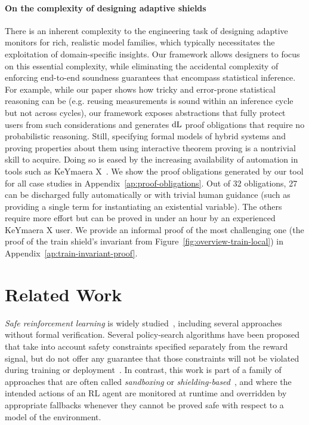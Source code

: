 \documentclass[acmsmall,screen,nonacm]{acmart}
\begin{document}
\paragraph{On the complexity of designing adaptive shields} There is an inherent complexity to the engineering task of designing adaptive monitors for rich, realistic model families, which typically necessitates the exploitation of domain-specific insights. Our framework allows designers to focus on this essential complexity, while eliminating the accidental complexity of enforcing end-to-end soundness guarantees that encompass statistical inference. For example, while our paper shows how tricky and error-prone statistical reasoning can be (e.g. reusing measurements is sound within an inference cycle but not across cycles), our framework exposes abstractions that fully protect users from such considerations and generates $\mathop{}\!\mathrm{d} \text{L}$ proof obligations that require no probabilistic reasoning.
Still, specifying formal models of hybrid systems and proving properties about them using interactive theorem proving is a nontrivial skill to acquire. Doing so is eased by the increasing availability of automation in tools such as KeYmaera X~\cite{DBLP:conf/cade/FultonMQVP15,DBLP:journals/fmsd/SogokonMTCP22}. We show the proof obligations generated by our tool for all case studies in Appendix~\ref{ap:proof-obligations}. Out of 32 obligations, 27 can be discharged fully automatically or with trivial human guidance (such as providing a single term for instantiating an existential variable). The others require more effort but can be proved in under an hour by an experienced KeYmaera X user. We provide an informal proof of the most challenging one (the proof of the train shield's invariant from Figure~\ref{fig:overview-train-local}) in Appendix~\ref{ap:train-invariant-proof}.


\section{Related Work}


\emph{Safe reinforcement learning} is widely studied~\cite{DBLP:journals/corr/abs-2205-10330,DBLP:journals/jmlr/GarciaF15,brunke2022safe}, including several approaches without formal verification. Several policy-search algorithms have been proposed that take into account safety constraints specified separately from the reward signal, but do not offer any guarantee that those constraints will not be violated during training or deployment~\cite{DBLP:conf/icml/AchiamHTA17,DBLP:conf/aaai/YangSTS21,DBLP:conf/iclr/TesslerMM19}. In contrast, this work is part of a family of approaches that are often called \emph{sandboxing} or \emph{shielding-based}~\cite{DBLP:conf/aaai/AlshiekhBEKNT18,DBLP:conf/aaai/FultonP18,DBLP:conf/icra/ThummA22}, and where the intended actions of an RL agent are monitored at runtime and overridden by appropriate fallbacks whenever they cannot be proved safe with respect to a model of the environment.
\end{document}
